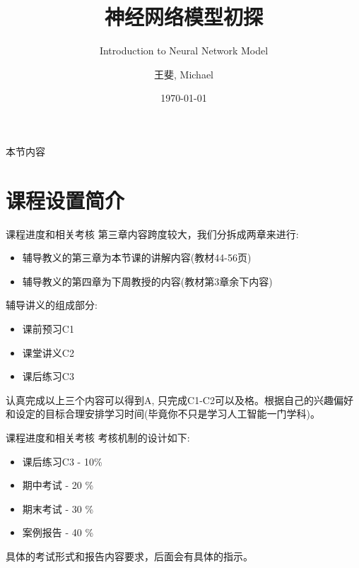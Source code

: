 \documentclass[handout]{beamer}
\title[]{神经网络模型初探}
\subtitle{Introduction to Neural Network Model}
\date{\today}
\author[Michael]{王斐, Michael}
\institute[SenseTime]{\url{https://www.michaelyunfei.com} \and \url{https://github.com/Michael-yunfei/MDLforBeginners}}
\begin{document}



\begin{frame}[noframenumbering]
  \titlepage
\end{frame}



\begin{frame}{本节内容}
	\tableofcontents
\end{frame}

\section{课程设置简介}

\begin{frame}{课程进度和相关考核}
第三章内容跨度较大，我们分拆成两章来进行:
\begin{itemize}
\setlength\itemsep{1em}
	\item 辅导教义的第三章为本节课的讲解内容(教材44-56页)
	\item 辅导教义的第四章为下周教授的内容(教材第3章余下内容)
\end{itemize}

\hfil

辅导讲义的组成部分:
\begin{itemize}
\setlength\itemsep{1em}
	\item 课前预习C1
	\item 课堂讲义C2
	\item 课后练习C3
\end{itemize}

\hfil 

认真完成以上三个内容可以得到A, 只完成C1-C2可以及格。根据自己的兴趣偏好和设定的目标合理安排学习时间(毕竟你不只是学习人工智能一门学科)。
\end{frame}

\begin{frame}{课程进度和相关考核}
	考核机制的设计如下:
	
	\hfil
	
	\begin{itemize}
	\setlength\itemsep{1em}
		\item 课后练习C3 - 10\% 
		\item 期中考试 - 20 \% 
		\item 期末考试 - 30 \%
		\item 案例报告 - 40 \% 
	\end{itemize}
	具体的考试形式和报告内容要求，后面会有具体的指示。
\end{frame}
\end{document}
